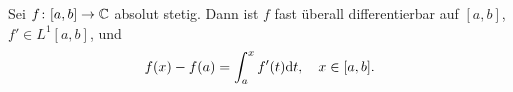 Sei $f\colon[a,b]\to \mathbb{C}$ absolut stetig. \pause Dann ist $f$ fast überall differentierbar auf $[a,b]$, \pause $f'\in L^1[a,b]$, \pause und
\begin{equation*}
    f(x) - f(a) = \int_a^x f'(t)\mathrm{d} t, \quad x\in[a,b].
\end{equation*}